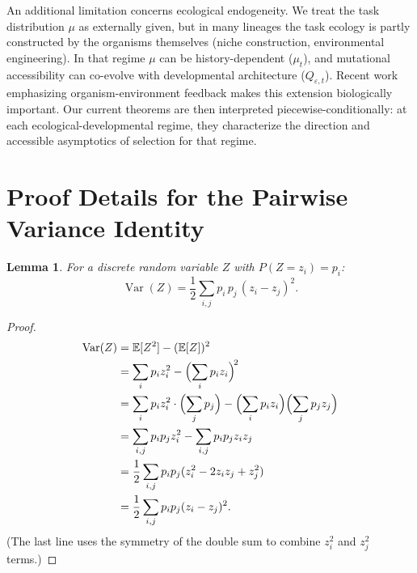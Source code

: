 \documentclass[12pt]{article}
\newtheorem{lemma}[theorem]{Lemma}
\newcommand{\E}{\mathbb{E}}
\newcommand{\Var}{\operatorname{Var}}
\begin{document}
An additional limitation concerns ecological endogeneity. We treat the task distribution $\mu$ as externally given, but in many lineages the task ecology is partly constructed by the organisms themselves (niche construction, environmental engineering). In that regime $\mu$ can be history-dependent ($\mu_t$), and mutational accessibility can co-evolve with developmental architecture ($Q_{\varepsilon,t}$). Recent work emphasizing organism-environment feedback \citep{godfreysmith_2024} makes this extension biologically important. Our current theorems are then interpreted piecewise-conditionally: at each ecological-developmental regime, they characterize the direction and accessible asymptotics of selection for that regime.



\appendix

\section{Proof Details for the Pairwise Variance Identity}\label{app:pairwise}

\begin{lemma}\label{lem:pairwise-variance}
For a discrete random variable $Z$ with $P(Z = z_i) = p_i$:
\begin{equation}
\Var(Z) = \frac{1}{2} \sum_{i,j} p_i\, p_j\, (z_i - z_j)^2.
\end{equation}
\end{lemma}

\begin{proof}
\begin{align*}
\Var(Z) &= \E[Z^2] - (\E[Z])^2 \\
        &= \sum_i p_i z_i^2 - \Bigl(\sum_i p_i z_i\Bigr)^{\!2} \\
        &= \sum_i p_i z_i^2 \cdot \Bigl(\sum_j p_j\Bigr) - \Bigl(\sum_i p_i z_i\Bigr)\Bigl(\sum_j p_j z_j\Bigr) \\
        &= \sum_{i,j} p_i p_j z_i^2 - \sum_{i,j} p_i p_j z_i z_j \\
        &= \frac{1}{2} \sum_{i,j} p_i p_j (z_i^2 - 2 z_i z_j + z_j^2) \\
        &= \frac{1}{2} \sum_{i,j} p_i p_j (z_i - z_j)^2.
\end{align*}
(The last line uses the symmetry of the double sum to combine $z_i^2$ and $z_j^2$ terms.)
\end{proof}
\end{document}
